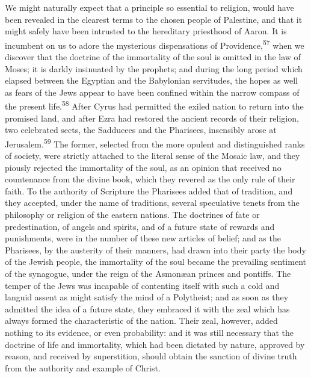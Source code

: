 We might naturally expect that a principle so essential to
religion, would have been revealed in the clearest terms to the
chosen people of Palestine, and that it might safely have been
intrusted to the hereditary priesthood of Aaron. It is incumbent
on us to adore the mysterious dispensations of Providence,\textsuperscript{57}
when we discover that the doctrine of the immortality of the soul
is omitted in the law of Moses; it is darkly insinuated by the
prophets; and during the long period which elapsed between the
Egyptian and the Babylonian servitudes, the hopes as well as
fears of the Jews appear to have been confined within the narrow
compass of the present life.\textsuperscript{58} After Cyrus had permitted the
exiled nation to return into the promised land, and after Ezra
had restored the ancient records of their religion, two
celebrated sects, the Sadducees and the Pharisees, insensibly
arose at Jerusalem.\textsuperscript{59} The former, selected from the more opulent
and distinguished ranks of society, were strictly attached to the
literal sense of the Mosaic law, and they piously rejected the
immortality of the soul, as an opinion that received no
countenance from the divine book, which they revered as the only
rule of their faith. To the authority of Scripture the Pharisees
added that of tradition, and they accepted, under the name of
traditions, several speculative tenets from the philosophy or
religion of the eastern nations. The doctrines of fate or
predestination, of angels and spirits, and of a future state of
rewards and punishments, were in the number of these new articles
of belief; and as the Pharisees, by the austerity of their
manners, had drawn into their party the body of the Jewish
people, the immortality of the soul became the prevailing
sentiment of the synagogue, under the reign of the Asmonæan
princes and pontiffs. The temper of the Jews was incapable of
contenting itself with such a cold and languid assent as might
satisfy the mind of a Polytheist; and as soon as they admitted
the idea of a future state, they embraced it with the zeal which
has always formed the characteristic of the nation. Their zeal,
however, added nothing to its evidence, or even probability: and
it was still necessary that the doctrine of life and immortality,
which had been dictated by nature, approved by reason, and
received by superstition, should obtain the sanction of divine
truth from the authority and example of Christ.

